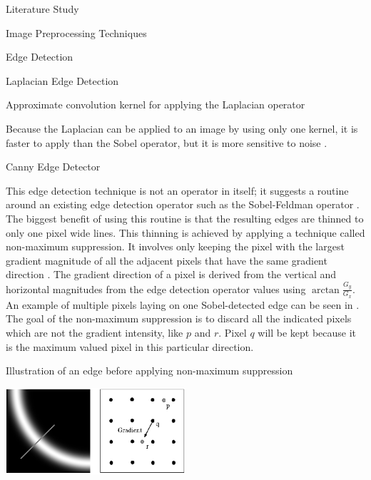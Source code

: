 \documentclass{matthijs}
\begin{document}
\begin{hoofdstuk}{Literature Study}
\begin{paragraaf}{Image Preprocessing Techniques}
\begin{subparagraaf}{Edge Detection}
\begin{subsubparagraaf}{Laplacian Edge Detection}
\begin{figuur}{Approximate convolution kernel for applying the Laplacian operator}
						\cite{tai2008fast}
					\end{figuur}

					Because the Laplacian can be applied to an image by using only one kernel, it is faster to apply than the Sobel operator, but it is more sensitive to noise \cite{sinha2017sobel}.
				\end{subsubparagraaf}

				\begin{subsubparagraaf}{Canny Edge Detector}

					This edge detection technique is not an operator in itself; it suggests a routine around an existing edge detection operator such as the Sobel-Feldman operator \cite{canny1986computational}.
					The biggest benefit of using this routine is that the resulting edges are thinned to only one pixel wide lines.
					This thinning is achieved by applying a technique called non-maximum suppression.
					It involves only keeping the pixel with the largest gradient magnitude of all the adjacent pixels that have the same gradient direction \cite{sarab2020canny}.
					The gradient direction of a pixel is derived from the vertical and horizontal magnitudes from the edge detection operator values using $\arctan \frac{G_y}{G_x}$.
					An example of multiple pixels laying on one Sobel-detected edge can be seen in .
					The goal of the non-maximum suppression is to discard all the indicated pixels which are not the gradient intensity, like $p$ and $r$.
					Pixel $q$ will be kept because it is the maximum valued pixel in this particular direction.
					
					\begin{figuur}{Illustration of an edge before applying non-maximum suppression}

						\includegraphics[width=0.5\textwidth]{teli2019canny-img1.png}
						\cite{teli2019canny}

					\end{figuur}


\end{subsubparagraaf}
\end{subparagraaf}
\end{paragraaf}
\end{hoofdstuk}
\end{document}

